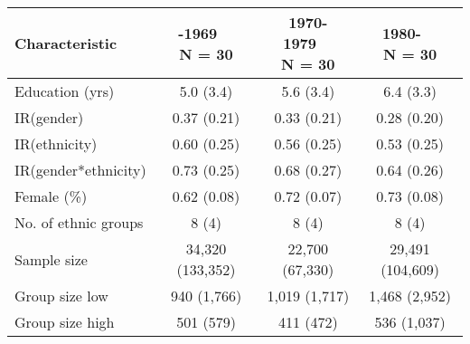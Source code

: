 
\begin{tabular}{lccc}
\toprule
\textbf{Characteristic} & \makecell[c]{\textbf{-1969}\ \ \\N = 30} & \makecell[c]{\textbf{1970-1979}\ \ \\N = 30} & \makecell[c]{\textbf{1980-}\ \ \\N = 30}\\
\midrule
Education (yrs) & 5.0 (3.4) & 5.6 (3.4) & 6.4 (3.3)\\
IR(gender) & 0.37 (0.21) & 0.33 (0.21) & 0.28 (0.20)\\
IR(ethnicity) & 0.60 (0.25) & 0.56 (0.25) & 0.53 (0.25)\\
IR(gender*ethnicity) & 0.73 (0.25) & 0.68 (0.27) & 0.64 (0.26)\\
Female (\%) & 0.62 (0.08) & 0.72 (0.07) & 0.73 (0.08)\\
No. of ethnic groups & 8 (4) & 8 (4) & 8 (4)\\
Sample size & 34,320 (133,352) & 22,700 (67,330) & 29,491 (104,609)\\
Group size low & 940 (1,766) & 1,019 (1,717) & 1,468 (2,952)\\
Group size high & 501 (579) & 411 (472) & 536 (1,037)\\
\bottomrule
\end{tabular}
